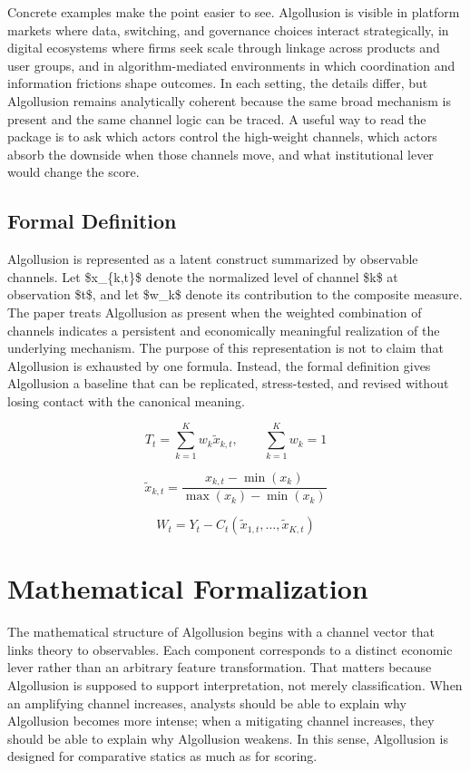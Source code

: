 \documentclass[12pt]{article}
\begin{document}
Concrete examples make the point easier to see. Algollusion is visible in platform markets where data, switching, and governance choices interact strategically, in digital ecosystems where firms seek scale through linkage across products and user groups, and in algorithm-mediated environments in which coordination and information frictions shape outcomes. In each setting, the details differ, but Algollusion remains analytically coherent because the same broad mechanism is present and the same channel logic can be traced. A useful way to read the package is to ask which actors control the high-weight channels, which actors absorb the downside when those channels move, and what institutional lever would change the score.

\subsection{Formal Definition}
Algollusion is represented as a latent construct summarized by observable channels. Let \$x\_\{k,t\}\$ denote the normalized level of channel \$k\$ at observation \$t\$, and let \$w\_k\$ denote its contribution to the composite measure. The paper treats Algollusion as present when the weighted combination of channels indicates a persistent and economically meaningful realization of the underlying mechanism. The purpose of this representation is not to claim that Algollusion is exhausted by one formula. Instead, the formal definition gives Algollusion a baseline that can be replicated, stress-tested, and revised without losing contact with the canonical meaning.

\begin{equation}
T_t = \sum_{k=1}^K w_k \tilde{x}_{k,t}, \qquad \sum_{k=1}^K w_k = 1
\label{eq:index}
\end{equation}

\begin{equation}
\tilde{x}_{k,t} = \frac{x_{k,t} - \min(x_k)}{\max(x_k) - \min(x_k)}
\label{eq:norm}
\end{equation}

\begin{equation}
W_t = Y_t - C_t(\tilde{x}_{1,t}, \dots, \tilde{x}_{K,t})
\label{eq:welfare}
\end{equation}

\section{Mathematical Formalization}
The mathematical structure of Algollusion begins with a channel vector that links theory to observables. Each component corresponds to a distinct economic lever rather than an arbitrary feature transformation. That matters because Algollusion is supposed to support interpretation, not merely classification. When an amplifying channel increases, analysts should be able to explain why Algollusion becomes more intense; when a mitigating channel increases, they should be able to explain why Algollusion weakens. In this sense, Algollusion is designed for comparative statics as much as for scoring.
\end{document}
